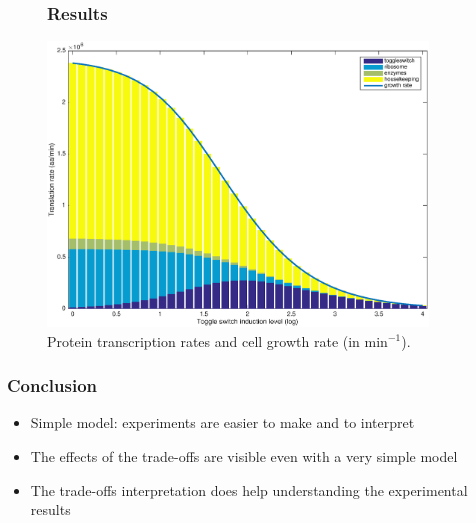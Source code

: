 \documentclass{beamer}
\begin{document}
\begin{frame}
\begin{figure}
\frametitle{Results}
\includegraphics[width=0.9\textwidth]{induction.eps}
\caption{Protein transcription rates and cell growth rate (in min$^{-1}$).}
\end{figure}
\end{frame}

\begin{frame}
\frametitle{Conclusion}
\begin{itemize}
\item Simple model: experiments are easier to make and to interpret
\item The effects of the trade-offs are visible even with a very simple model
\item The trade-offs interpretation does help understanding the experimental results
\end{itemize}
\end{frame}
\end{document}
